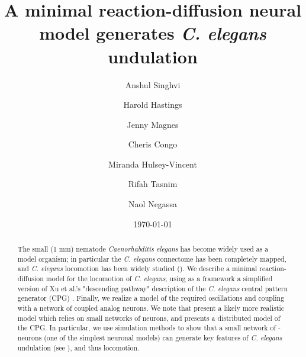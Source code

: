 \documentclass[
    11pt,
]{article}
\begin{document}


\title{A minimal reaction-diffusion neural model generates {\emph{C. elegans}} undulation}

\author[1]{Anshul Singhvi}

\author[1,3]{Harold Hastings}

\author[2]{Jenny Magnes}

\author[2]{Cheris Congo}

\author[2]{Miranda Hulsey-Vincent}

\author[1]{Rifah Tasnim}

\author[1]{Naol Negassa}


\date{\today}

\begin{abstract}

    The small (1 mm) nematode \emph{Caenorhabditis elegans} \cite{corsi2015} has become widely used as a model organism; in particular the \emph{C. elegans} connectome has been completely mapped, and \emph{C. elegans} locomotion has been widely studied (\citet{corsi2015}). We describe a minimal reaction-diffusion model for the locomotion of \emph{C. elegans}, using as a framework a simplified version of Xu et al.'s "descending pathway" description of the \emph{C. elegans} central pattern generator (CPG) \citet{xu2018,wen2012}.  Finally, we realize a model of the required oscillations and coupling with a network of coupled \citet{keener1983} analog neurons.
    We note that \citet{olivares2019} present a likely more realistic model which relies on small networks of neurons, and presents a distributed model of the CPG. In particular, we use simulation methods to show that a small network of \citet{fitzhugh1955}-\citet{nagumo1962} neurons (one of the simplest neuronal models) can generate key features of \emph{C. elegans} undulation (see \citet{magnes2012}), and thus locomotion.
\end{abstract}

\maketitle
\end{document}
